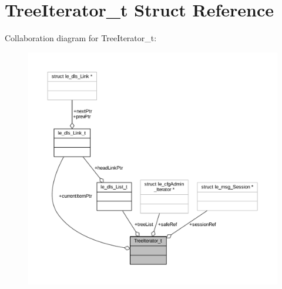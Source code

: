 \hypertarget{struct_tree_iterator__t}{}\section{Tree\+Iterator\+\_\+t Struct Reference}
\label{struct_tree_iterator__t}


Collaboration diagram for Tree\+Iterator\+\_\+t\+:
\nopagebreak
\begin{figure}[H]
\begin{center}
\leavevmode
\includegraphics[width=350pt]{struct_tree_iterator__t__coll__graph}
\end{center}
\end{figure}
